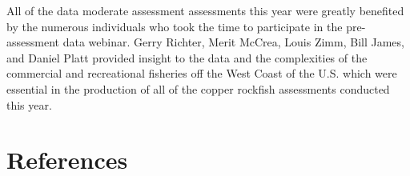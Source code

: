 \documentclass[11pt,
  english,
  a4paper,
]{article}
\begin{document}

All of the data moderate assessment assessments this year were greatly benefited by the numerous individuals who took the time to participate in the pre-assessment data webinar. Gerry Richter, Merit McCrea, Louis Zimm, Bill James, and Daniel Platt provided insight to the data and the complexities of the commercial and recreational fisheries off the West Coast of the U.S. which were essential in the production of all of the copper rockfish assessments conducted this year.

\leavevmode\tagmcend\tagstructend\par

\clearpage


\hypertarget{references}{%
\section{References}\label{references}}

\leavevmode\tagmcend\tagstructend

\end{document}
